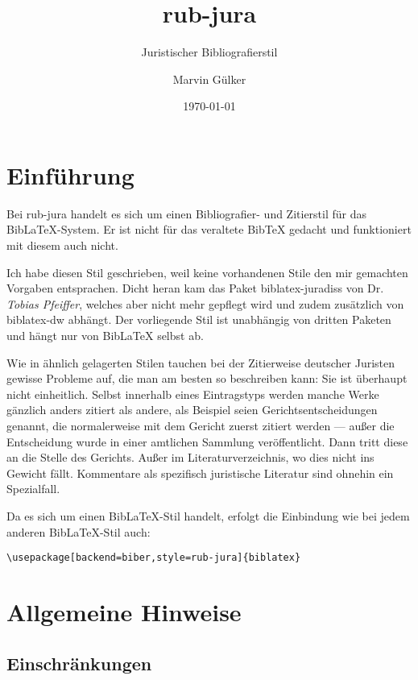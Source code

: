 \documentclass[11pt,a4paper,DIV=calc,draft]{scrartcl}
\newcommand\software[1]{\textsf{#1}}
\newcommand\rj{\software{rub-jura}\xspace}
\newcommand\Biblatex{\software{Bib\LaTeX{}}\xspace}
\newcommand\name[1]{\textit{#1}}
\begin{document}
\title{rub-jura}
\subtitle{Juristischer Bibliografierstil}
\author{Marvin Gülker}
\date{\today}
\maketitle{}

\tableofcontents{}
\listoftables{}

\section{Einführung}

Bei \rj handelt es sich um einen Bibliografier- und Zitierstil für das
\Biblatex-System. Er ist nicht für das veraltete \software{Bib\TeX{}}
gedacht und funktioniert mit diesem auch nicht.

Ich habe diesen Stil geschrieben, weil keine vorhandenen Stile den mir
gemachten Vorgaben entsprachen. Dicht heran kam das Paket
\software{biblatex-juradiss} von Dr. \name{Tobias Pfeiffer}, welches
aber nicht mehr gepflegt wird und zudem zusätzlich von
\software{biblatex-dw} abhängt. Der vorliegende Stil ist unabhängig
von dritten Paketen und hängt nur von \Biblatex selbst ab.

Wie in ähnlich gelagerten Stilen tauchen bei der Zitierweise deutscher
Juristen gewisse Probleme auf, die man am besten so beschreiben kann:
Sie ist überhaupt nicht einheitlich. Selbst innerhalb eines
Eintragstyps werden manche Werke gänzlich anders zitiert als andere,
als Beispiel seien Gerichtsentscheidungen genannt, die normalerweise
mit dem Gericht zuerst zitiert werden — außer die Entscheidung wurde
in einer amtlichen Sammlung veröffentlicht. Dann tritt diese an die
Stelle des Gerichts. Außer im Literaturverzeichnis, wo dies nicht ins
Gewicht fällt. Kommentare als spezifisch juristische Literatur sind
ohnehin ein Spezialfall.

Da es sich um einen \Biblatex-Stil handelt, erfolgt die Einbindung wie
bei jedem anderen \Biblatex-Stil auch:

\begin{verbatim}
\usepackage[backend=biber,style=rub-jura]{biblatex}
\end{verbatim}

\section{Allgemeine Hinweise}

\subsection{Einschränkungen}
\end{document}
